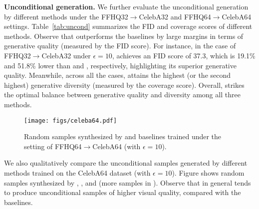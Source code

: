 {\bf Unconditional generation.} We further evaluate the unconditional generation by different methods under the FFHQ32$\rightarrow$CelebA32 and FFHQ64$\rightarrow$CelebA64 settings. Table~\ref{tab:uncond} summarizes the FID and coverage scores of different methods. Observe that \system outperforms the baselines by large margins in terms of generative quality (measured by the FID score). For instance, in the case of FFHQ32$\rightarrow$CelebA32 under $\epsilon = 10$, \system achieves an FID score of 37.3, which is 19.1\% and 51.8\% lower than \dpldm and \dpdm, respectively, highlighting its superior generative quality. Meanwhile, across all the cases, \system attains the highest (or the second highest) generative diversity (measured by the coverage score). Overall, \system strikes the optimal balance between generative quality and diversity among all three methods.





\begin{figure}[htp]
    \centering
    \texttt{[image: figs/celeba64.pdf]}
    \caption{Random samples synthesized by \system and baselines trained under the setting of FFHQ64$\rightarrow$CelebA64 (with $\epsilon = 10$).}
    \label{fig:CelebA64}
\end{figure}


We also qualitatively compare the unconditional samples generated by different methods trained on the CelebA64 dataset (with $\epsilon = 10$). Figure shows random samples synthesized by \dpdm, \dpldm, and \system (more samples in ). Observe that in general \system tends to produce unconditional samples of higher visual quality, compared with the baselines. 



